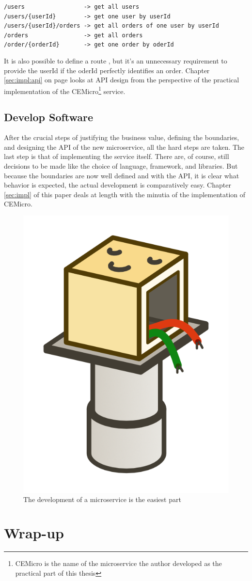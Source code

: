 \begin{lstlisting}
/users                 -> get all users
/users/{userId}        -> get one user by userId
/users/{userId}/orders -> get all orders of one user by userId
/orders                -> get all orders
/order/{orderId}       -> get one order by oderId
\end{lstlisting}

It is also possible to define a route , but it's an unnecessary requirement to provide the userId if the oderId perfectly identifies an order. Chapter \ref{sec:impl:api} on page \pageref{sec:impl:api} looks at API design from the perspective of the practical implementation of the CEMicro\footnote{CEMicro is the name of the microservice the author developed as the practical part of this thesis} service.


\subsection{Develop Software}

After the crucial steps of justifying the business value, defining the boundaries, and designing the API of the new microservice, all the hard steps are taken. The last step is that of implementing the service itself. There are, of course, still decisions to be made like the choice of language, framework, and libraries. But because the boundaries are now well defined and with the API, it is clear what behavior is expected, the actual development is comparatively easy. Chapter \ref{sec:impl} of this paper deals at length with the minutia of the implementation of CEMicro.

\begin{figure}[ht]
  \centering
  \includegraphics[width=0.2\linewidth]{assets/illustration-microservice-development.png}
  \caption{The development of a microservice is the easiest part}
\end{figure}



\section{Wrap-up}


